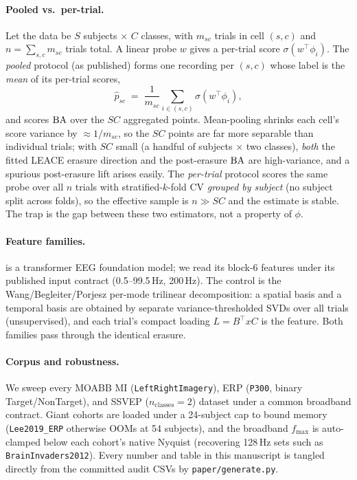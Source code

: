 \documentclass[11pt]{article}
\begin{document}
\paragraph{Pooled vs.\ per-trial.} Let the data be $S$ subjects $\times$ $C$ classes, with $m_{sc}$
trials in cell $(s,c)$ and $n=\sum_{s,c} m_{sc}$ trials total. A linear probe $w$ gives a per-trial
score $\sigma(w^{\top}\phi_i)$. The \emph{pooled} protocol (as published) forms one recording per
$(s,c)$ whose label is the \emph{mean} of its per-trial scores,
\begin{equation}
\hat p_{sc} \;=\; \frac{1}{m_{sc}}\sum_{i\in(s,c)} \sigma\!\left(w^{\top}\phi_i\right),
\label{eq:pool}
\end{equation}
and scores $\mathrm{BA}$ over the $SC$ aggregated points. Mean-pooling shrinks each cell's score variance by
$\approx 1/m_{sc}$, so the $SC$ points are far more separable than individual trials; with $SC$
small (a handful of subjects $\times$ two classes), \emph{both} the fitted LEACE erasure direction
and the post-erasure $\mathrm{BA}$ are high-variance, and a spurious post-erasure lift arises easily. The
\emph{per-trial} protocol scores the same probe over all $n$ trials with stratified-$k$-fold CV
\emph{grouped by subject} (no subject split across folds), so the effective sample is $n\gg SC$ and
the estimate is stable. The trap is the gap between these two estimators, not a property of $\phi$.

\paragraph{Feature families.} \reve{} is a transformer EEG foundation model; we read its block-6
features under its published input contract (0.5--99.5\,Hz, 200\,Hz). The \tcm{} control is the
Wang/Begleiter/Porjesz per-mode trilinear decomposition: a spatial basis and a temporal basis are
obtained by separate variance-thresholded SVDs over all trials (unsupervised), and each trial's
compact loading $L=B^{\top}xC$ is the feature. Both families pass through the identical erasure.

\paragraph{Corpus and robustness.} We sweep every MOABB MI (\texttt{LeftRightImagery}), ERP
(\texttt{P300}, binary Target/NonTarget), and SSVEP ($n_{\text{classes}}=2$) dataset under a common
broadband contract. Giant cohorts are loaded under a 24-subject cap to bound memory
(\texttt{Lee2019\_ERP} otherwise OOMs at 54 subjects), and the broadband $f_{\max}$ is auto-clamped
below each cohort's native Nyquist (recovering 128\,Hz sets such as \texttt{BrainInvaders2012}).
Every number and table in this manuscript is tangled directly from the committed audit CSVs by
\texttt{paper/generate.py}.
\end{document}
